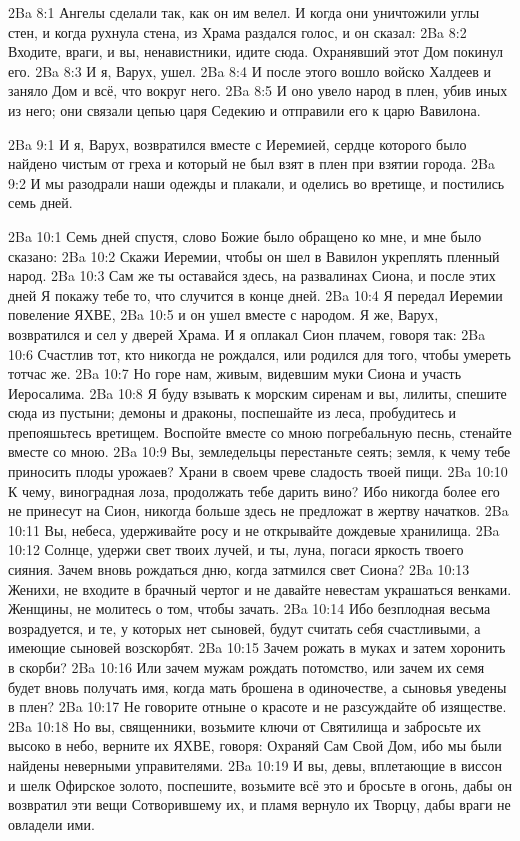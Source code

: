 \vs 2Ba 8:1
Ангелы сделали так, как он им велел. И когда они уничтожили углы стен, и когда рухнула стена, из Храма раздался голос, и он сказал:
\vs 2Ba 8:2
Входите, враги, и вы, ненавистники, идите сюда. Охранявший этот Дом покинул его.
\vs 2Ba 8:3
И я, Варух, ушел.
\vs 2Ba 8:4
И после этого вошло войско Халдеев и заняло Дом и всё, что вокруг него.
\vs 2Ba 8:5
И оно увело народ в плен, убив иных из него; они связали цепью царя Седекию и отправили его к царю Вавилона.

\vs 2Ba 9:1
И я, Варух, возвратился вместе с Иеремией, сердце которого было найдено чистым от греха и который не был взят в плен при взятии города.
\vs 2Ba 9:2
И мы разодрали наши одежды и плакали, и оделись во вретище, и постились семь дней.

\vs 2Ba 10:1
Семь дней спустя, слово Божие было обращено ко мне, и мне было сказано:
\vs 2Ba 10:2
Скажи Иеремии, чтобы он шел в Вавилон укреплять пленный народ.
\vs 2Ba 10:3
Сам же ты оставайся здесь, на развалинах Сиона, и после этих дней Я покажу тебе то, что случится в конце дней.
\vs 2Ba 10:4
Я передал Иеремии повеление ЯХВЕ,
\vs 2Ba 10:5
и он ушел вместе с народом. Я же, Варух, возвратился и сел у дверей Храма. И я оплакал Сион плачем, говоря так:
\vs 2Ba 10:6
Счастлив тот, кто никогда не рождался, или родился для того, чтобы умереть тотчас же.
\vs 2Ba 10:7
Но горе нам, живым, видевшим муки Сиона и участь Иеросалима.
\vs 2Ba 10:8
Я буду взывать к морским сиренам и вы, лилиты, спешите сюда из пустыни; демоны и драконы, поспешайте из леса, пробудитесь и препояшьтесь вретищем. Воспойте вместе со мною погребальную песнь, стенайте вместе со мною.
\vs 2Ba 10:9
Вы, земледельцы перестаньте сеять; земля, к чему тебе приносить плоды урожаев? Храни в своем чреве сладость твоей пищи.
\vs 2Ba 10:10
К чему, виноградная лоза, продолжать тебе дарить вино? Ибо никогда более его не принесут на Сион, никогда больше здесь не предложат в жертву начатков.
\vs 2Ba 10:11
Вы, небеса, удерживайте росу и не открывайте дождевые хранилища.
\vs 2Ba 10:12
Солнце, удержи свет твоих лучей, и ты, луна, погаси яркость твоего сияния. Зачем вновь рождаться дню, когда затмился свет Сиона?
\vs 2Ba 10:13
Женихи, не входите в брачный чертог и не давайте невестам украшаться венками. Женщины, не молитесь о том, чтобы зачать.
\vs 2Ba 10:14
Ибо безплодная весьма возрадуется, и те, у которых нет сыновей, будут считать себя счастливыми, а имеющие сыновей возскорбят.
\vs 2Ba 10:15
Зачем рожать в муках и затем хоронить в скорби?
\vs 2Ba 10:16
Или зачем мужам рождать потомство, или зачем их семя будет вновь получать имя, когда мать брошена в одиночестве, а сыновья уведены в плен?
\vs 2Ba 10:17
Не говорите отныне о красоте и не разсуждайте об изяществе.
\vs 2Ba 10:18
Но вы, священники, возьмите ключи от Святилища и забросьте их высоко в небо, верните их ЯХВЕ, говоря: Охраняй Сам Свой Дом, ибо мы были найдены неверными управителями.
\vs 2Ba 10:19
И вы, девы, вплетающие в виссон и шелк Офирское золото, поспешите, возьмите всё это и бросьте в огонь, дабы он возвратил эти вещи Сотворившему их, и пламя вернуло их Творцу, дабы враги не овладели ими.

